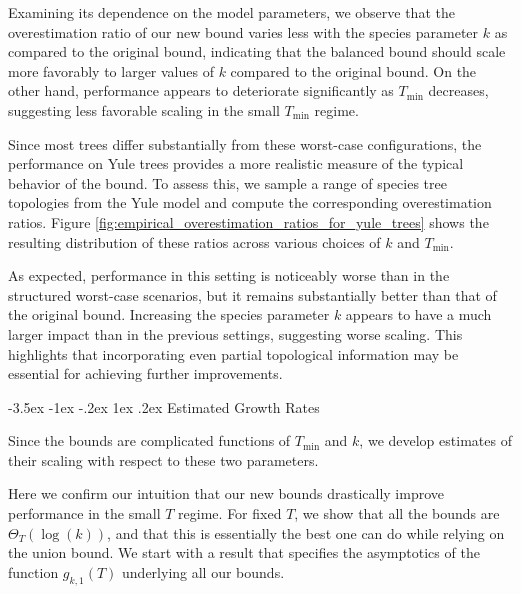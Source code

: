 \documentclass[10pt,oneside,reqno]{article}
\makeatletter
\theoremstyle{plain}
\theoremstyle{definition}
\numberwithin{equation}{section}
\def\subsection#1{\@startsection {subsection}{2}{0pt}%
{-3.5ex \@plus -1ex \@minus -.2ex}%
{1ex \@plus.2ex}%
{\bf\mathversion{bold}}{#1}}
\makeatother
\begin{document}
Examining its dependence on the model parameters, we observe that the overestimation ratio of our new bound varies less with the species parameter $k$ as compared to the original bound, indicating that the balanced bound should scale more favorably to larger values of $k$ compared to the original bound. On the other hand, performance appears to deteriorate significantly as $T_{\mathrm{min}}$ decreases, suggesting less favorable scaling in the small $T_{\mathrm{min}}$ regime.


Since most trees differ substantially from these worst-case configurations, the performance on Yule trees provides a more realistic measure of the typical behavior of the bound. To assess this, we sample a range of species tree topologies from the Yule model and compute the corresponding overestimation ratios. Figure \ref{fig:empirical_overestimation_ratios_for_yule_trees} shows the resulting distribution of these ratios across various choices of $k$ and $T_{\min}$. 

As expected, performance in this setting is noticeably worse than in the structured worst-case scenarios, but it remains substantially better than that of the original bound. Increasing the species parameter $k$ appears to have a much larger impact than in the previous settings, suggesting worse scaling. This highlights that incorporating even partial topological information may be essential for achieving further improvements.

\subsection{Estimated Growth Rates}
\label{sec:estimated_growth_rates}

 Since the bounds are complicated functions of $T_{\mathrm{min}}$ and $k$, we develop estimates of their scaling with respect to these two parameters.

 Here we confirm our intuition that our new bounds drastically improve performance in the small $T$ regime. For fixed $T$, we show that all the bounds are $\Theta_T(\log(k))$, and that this is essentially the best one can do while relying on the union bound. We start with a result that specifies the asymptotics of the function $g_{k,1}(T)$ underlying all our bounds.
\end{document}
